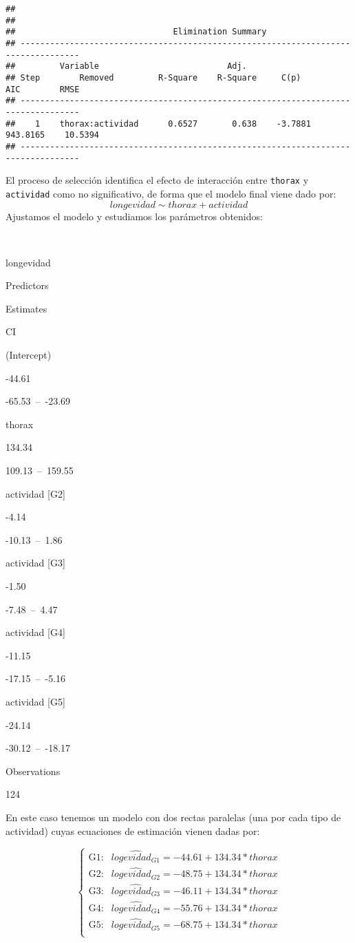 \documentclass[
]{book}
\theoremstyle{definition}
\theoremstyle{definition}
\theoremstyle{definition}
\theoremstyle{remark}
\begin{document}
\begin{verbatim}
## 
## 
##                                Elimination Summary                                 
## ----------------------------------------------------------------------------------
##         Variable                          Adj.                                        
## Step        Removed         R-Square    R-Square     C(p)        AIC        RMSE      
## ----------------------------------------------------------------------------------
##    1    thorax:actividad      0.6527       0.638    -3.7881    943.8165    10.5394    
## ----------------------------------------------------------------------------------
\end{verbatim}

El proceso de selección identifica el efecto de interacción entre \texttt{thorax} y \texttt{actividad} como no significativo, de forma que el modelo final viene dado por:
\[longevidad \sim thorax + actividad\]
Ajustamos el modelo y estudiamos los parámetros obtenidos:

~

longevidad

Predictors

Estimates

CI

(Intercept)

-44.61

-65.53~--~-23.69

thorax

134.34

109.13~--~159.55

actividad {[}G2{]}

-4.14

-10.13~--~1.86

actividad {[}G3{]}

-1.50

-7.48~--~4.47

actividad {[}G4{]}

-11.15

-17.15~--~-5.16

actividad {[}G5{]}

-24.14

-30.12~--~-18.17

Observations

124

En este caso tenemos un modelo con dos rectas paralelas (una por cada tipo de actividad) cuyas ecuaciones de estimación vienen dadas por:

\[
\left\{ 
\begin{array}{ll}
\mbox{G1}:& \widehat{logevidad_{G1}} = - 44.61 + 134.34*thorax\\
\mbox{G2}:& \widehat{logevidad_{G2}} = - 48.75 + 134.34*thorax \\
\mbox{G3}:& \widehat{logevidad_{G3}} = - 46.11 + 134.34*thorax \\
\mbox{G4}:& \widehat{logevidad_{G4}} = - 55.76 + 134.34*thorax \\
\mbox{G5}:& \widehat{logevidad_{G5}} = - 68.75 + 134.34*thorax \\
\end{array}
\right.
\]
\end{document}
